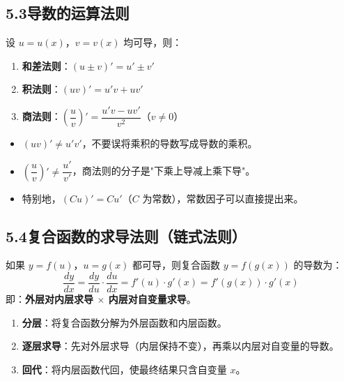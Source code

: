 \documentclass[12pt, a4paper]{ctexart}
\begin{document}
\subsection*{5.3\quad 导数的运算法则}

\begin{knowledgebox}[导数的四则运算法则]
设 $u = u(x)$，$v = v(x)$ 均可导，则：
\begin{enumerate}[leftmargin=2em]
  \item \textbf{和差法则}：$(u \pm v)' = u' \pm v'$
  \item \textbf{积法则}：$(uv)' = u'v + uv'$
  \item \textbf{商法则}：$\left(\dfrac{u}{v}\right)' = \dfrac{u'v - uv'}{v^2}$\quad（$v \neq 0$）
\end{enumerate}
\end{knowledgebox}

\begin{warnbox}[易错提醒]
\begin{itemize}[leftmargin=2em]
  \item $(uv)' \neq u'v'$，不要误将乘积的导数写成导数的乘积。
  \item $\left(\dfrac{u}{v}\right)' \neq \dfrac{u'}{v'}$，商法则的分子是"下乘上导减上乘下导"。
  \item 特别地，$(Cu)' = Cu'$（$C$ 为常数），常数因子可以直接提出来。
\end{itemize}
\end{warnbox}

\subsection*{5.4\quad 复合函数的求导法则（链式法则）}

\begin{knowledgebox}[链式法则]
如果 $y = f(u)$，$u = g(x)$ 都可导，则复合函数 $y = f(g(x))$ 的导数为：
\[
\frac{dy}{dx} = \frac{dy}{du} \cdot \frac{du}{dx} = f'(u) \cdot g'(x) = f'(g(x)) \cdot g'(x)
\]
即：\textbf{外层对内层求导 $\times$ 内层对自变量求导}。
\end{knowledgebox}

\begin{tipbox}[复合函数求导步骤]
\begin{enumerate}[leftmargin=2em]
  \item \textbf{分层}：将复合函数分解为外层函数和内层函数。
  \item \textbf{逐层求导}：先对外层求导（内层保持不变），再乘以内层对自变量的导数。
  \item \textbf{回代}：将内层函数代回，使最终结果只含自变量 $x$。
\end{enumerate}
\end{tipbox}
\end{document}
